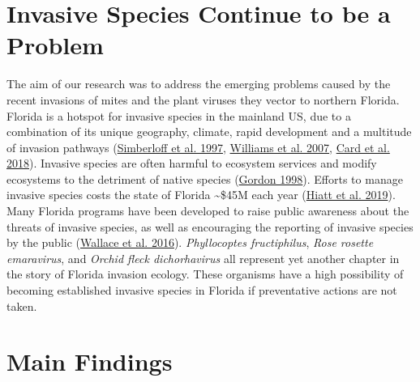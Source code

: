 \documentclass{ufdissertation}[overrideChapters] %
\begin{document}
{\hypertarget{invasive-species-continue-to-be-a-problem}{%
\section{Invasive Species Continue to be a Problem}\label{invasive-species-continue-to-be-a-problem}}

The aim of our research was to address the emerging problems caused by the recent invasions of mites and the plant viruses they vector to northern Florida. Florida is a hotspot for invasive species in the mainland US, due to a combination of its unique geography, climate, rapid development and a multitude of invasion pathways (\protect\hyperlink{ref-Simberloff1997}{Simberloff et al. 1997}, \protect\hyperlink{ref-Williams2007}{Williams et al. 2007}, \protect\hyperlink{ref-Card2018}{Card et al. 2018}). Invasive species are often harmful to ecosystem services and modify ecosystems to the detriment of native species (\protect\hyperlink{ref-Gordon1998}{Gordon 1998}). Efforts to manage invasive species costs the state of Florida \textasciitilde\$45M each year (\protect\hyperlink{ref-Hiatt2019}{Hiatt et al. 2019}). Many Florida programs have been developed to raise public awareness about the threats of invasive species, as well as encouraging the reporting of invasive species by the public (\protect\hyperlink{ref-Wallace2016}{Wallace et al. 2016}). \emph{Phyllocoptes fructiphilus}, \emph{Rose rosette emaravirus}, and \emph{Orchid fleck dichorhavirus} all represent yet another chapter in the story of Florida invasion ecology. These organisms have a high possibility of becoming established invasive species in Florida if preventative actions are not taken.

\hypertarget{main-findings}{%
\section{Main Findings}\label{main-findings}}

}
\end{document}
